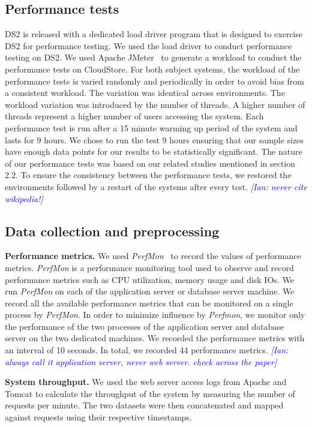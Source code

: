 \documentclass[smallextended]{svjour3}       %
\newcommand{\ian}[1]{\textcolor{blue}{{\it [Ian: #1]}}}
\begin{document}
\subsection{Performance tests}

DS2 is released with a dedicated load driver program that is designed to exercise DS2 for performance testing. We used the load driver to conduct performance testing on DS2. We used Apache JMeter~\cite{apachejmeter} to generate a workload to conduct the performance tests on CloudStore. For both subject systems, the workload of the performance tests is varied randomly and periodically in order to avoid bias from a consistent workload. The variation was identical across environments. The workload variation was introduced by the number of threads. A higher number of threads represent a higher number of users accessing the system. Each performance test is run after a 15 minute warming up period of the system and lasts for 9 hours. We chose to run the test 9 hours ensuring that our sample sizes have enough data points for our results to be statistically significant.
The nature of our performance tests was based on our related studies mentioned in section 2.2. To ensure the consistency between the performance tests, we restored the environments followed by a restart of the systems after every test. \ian{never cite wikipedia!}


\subsection{Data collection and preprocessing}

\noindent \textbf{Performance metrics.} We used \textit{PerfMon}~\cite{perfmon} to record the values of performance metrics. \textit{PerfMon} is a performance monitoring tool used to observe and record performance metrics such as CPU utilization, memory usage and disk IOs. We run \textit{PerfMon} on each of the application server or database server machine. We record all the available performance metrics that can be monitored on a single process by \emph{PerfMon}. In order to minimize influence by \textit{Perfmon}, we monitor only the performance of the two processes of the application server and database server on the two dedicated machines. We recorded the performance metrics with an interval of 10 seconds. In total, we recorded 44 performance metrics. \ian{always call it application server, never web server. check across the paper}

\noindent \textbf{System throughput.} We used the web server access logs from Apache and Tomcat to calculate the throughput of the system by measuring the number of requests per minute. The two datasets were then concatenated and mapped against requests using their respective timestamps.
\end{document}
